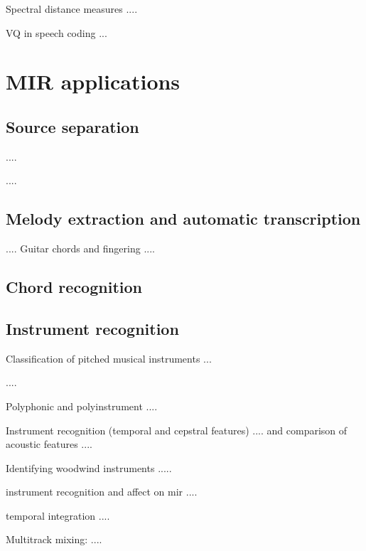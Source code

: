 \documentclass[journal]{IEEEtran}
\begin{document}
Spectral distance measures \cite{viswanathan1976spectralDistance}....

VQ in speech coding \cite{gersho1992vq}...

\section{MIR applications}
\subsection{Source separation}
\cite{slaney1994soundSeparation}....

\cite{ozerov2012general} ....

\subsection{Melody extraction and automatic transcription}

\cite{benetos2013automatic,ohanlon2013automatic,peeters2006music}....
Guitar chords and fingering \cite{barbancho2012automatic}....
\subsection{Chord recognition}
\subsection{Instrument recognition}
Classification of pitched musical instruments \cite{herrera2006automatic}...

\cite{martin1998musical,yu2014sparse}....

Polyphonic and polyinstrument \cite{hamel2009automatic}....

Instrument recognition (temporal and cepstral features) \cite{eronen2000musical}.... and comparison of acoustic features \cite{eronen2001comparison}....

Identifying woodwind instruments \cite{brown2001feature}.....

instrument recognition and affect on mir \cite{kitahara2007computational}....

temporal integration \cite{Joder:09}....

Multitrack mixing: \cite{scottinstrument,scott2011automatic}....
\end{document}
